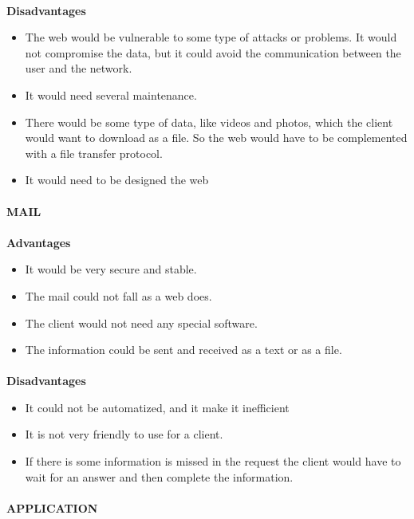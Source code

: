 \paragraph{} \textbf{Disadvantages}
\begin{itemize}
\item The web would be vulnerable to some type of attacks or problems. It would not compromise the data, but it could avoid the communication between the user and the network.
\item It would need several maintenance.
\item There would be some type of data, like videos and photos, which the client would want to download as a file. So the web would have to be complemented with a file transfer protocol.
\item It would need to be designed the web
\end{itemize}

\paragraph{} \textbf{MAIL}
\paragraph{} \textbf{Advantages}
\begin{itemize}
\item It would be very secure and stable.
\item The mail could not fall as a web does.
\item The client would not need any special software.
\item The information could be sent and received as a text or as a file.
\end{itemize}
\paragraph{} \textbf{Disadvantages}
\begin{itemize}
\item It could not be automatized, and it make it inefficient
\item It is not very friendly to use for a client.
\item If there is some information is missed in the request the client would have to wait for an answer and then complete the information. 
\end{itemize}

\paragraph{} \textbf{APPLICATION}
